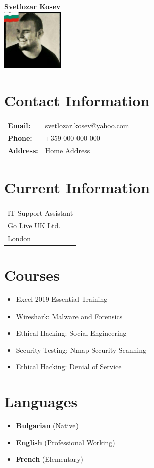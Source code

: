 \documentclass[letterpaper,10pt]{article}
\begin{document}
	
	\begin{minipage}[t]{0.4\textwidth}
		\begin{center}
			\Large\textbf{Svetlozar Kosev}\\[2ex]
			\includegraphics[width=3cm,height=3cm]{your_photo.jpg} %
		\end{center}
		
		\section*{Contact Information}
		\begin{tabular}{@{}l l}
			\textbf{Email:} & svetlozar.kosev@yahoo.com \\
			\textbf{Phone:} & +359 000 000 000 \\
			\textbf{Address:} & Home Address \\
		\end{tabular}
		
		\section*{Current Information}
		\begin{tabular}{@{}l}
			IT Support Assistant \\
			Go Live UK Ltd. \\
			London \\
		\end{tabular}
		
		\section*{Courses}
		\begin{itemize}
			\item Excel 2019 Essential Training
			\item Wireshark: Malware and Forensics
			\item Ethical Hacking: Social Engineering
			\item Security Testing: Nmap Security Scanning
			\item Ethical Hacking: Denial of Service
		\end{itemize}
		
		\section*{Languages}
		\begin{itemize}
			\item \textbf{Bulgarian} (Native)
			\item \textbf{English} (Professional Working)
			\item \textbf{French} (Elementary)
		\end{itemize}
	\end{minipage}
\end{document}
